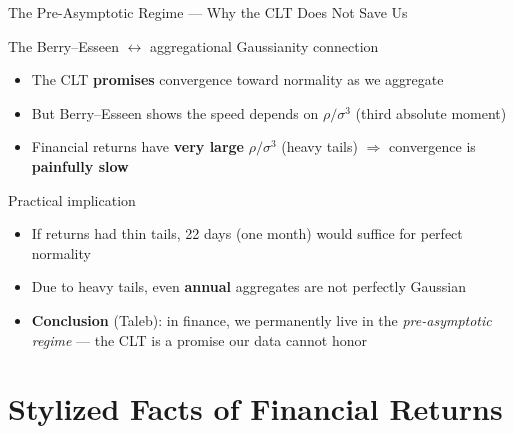 \documentclass[9pt, aspectratio=169, t]{beamer}
\theoremstyle{definition}
\begin{document}
\begin{frame}{The Pre-Asymptotic Regime --- Why the CLT Does Not Save Us}
\begin{block}{The Berry--Esseen $\leftrightarrow$ aggregational Gaussianity connection}
\begin{itemize}\setlength\itemsep{2pt}
\item The CLT \textbf{promises} convergence toward normality as we aggregate
\item But Berry--Esseen shows the speed depends on $\rho/\sigma^3$ (third absolute moment)
\item Financial returns have \textbf{very large} $\rho/\sigma^3$ (heavy tails) $\Rightarrow$ convergence is \textbf{painfully slow}
\end{itemize}
\end{block}
\begin{alertblock}{Practical implication}
\begin{itemize}\setlength\itemsep{2pt}
\item If returns had thin tails, 22 days (one month) would suffice for perfect normality
\item Due to heavy tails, even \textbf{annual} aggregates are not perfectly Gaussian
\item \textbf{Conclusion} (Taleb): in finance, we permanently live in the \textit{pre-asymptotic regime} --- the CLT is a promise our data cannot honor
\end{itemize}
\end{alertblock}
\end{frame}

\section{Stylized Facts of Financial Returns}
\end{document}
